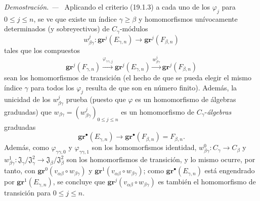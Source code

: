 \documentclass[10pt,oneside]{book}
\newenvironment{proof}{%
  \par\medskip\noindent\textit{Demostración. ---\ }}{\par}
\begin{document}
\begin{proof}
Aplicando el criterio (19.1.3) a cada uno de los $\varphi_j$ para $0\leq j\leq n$,
se ve que existe un índice $\gamma\geq\beta$ y homomorfismos
unívocamente determinados (y sobreyectivos) de $C_\gamma$-módulos
\[
  w_{\beta\gamma}^j:\mathbf{gr}^j(E_{\gamma,n})\longrightarrow
  \mathbf{gr}^j(F_{\beta,n})
\]
tales que los compuestos
\[
  \mathbf{gr}^j(F_{\gamma,n})
  \xrightarrow{\varphi_{\gamma\gamma,j}}\mathbf{gr}^j(E_{\gamma,n})
  \xrightarrow{w_{\beta\gamma}^j}\mathbf{gr}^j(F_{\beta,n})
\]
sean los homomorfismos de transición (el hecho de que se pueda elegir el mismo
índice $\gamma$ para todos los $\varphi_j$ resulta de que son en número
finito). Además, la unicidad de los $w_{\beta\gamma}^j$ prueba (puesto que $\varphi$ es
un homomorfismo de álgebras graduadas) que
$w_{\beta\gamma}=(w_{\beta\gamma}^j)_{0\leq j\leq n}$ es un homomorfismo de
$C_\gamma$-\emph{álgebras} graduadas
\[
  \mathbf{gr}^\bullet(E_{\gamma,n})\longrightarrow
  \mathbf{gr}^\bullet(F_{\beta,n})=F_{\beta,n}.
\]
Además, como $\varphi_{\gamma\gamma,0}$ y $\varphi_{\gamma\gamma,1}$ son
los homomorfismos identidad,
$w_{\beta\gamma}^0:C_\gamma\to C_\beta$ y
$w_{\beta\gamma}^1:\mathfrak J_\gamma/\mathfrak J_\gamma^2
\to\mathfrak J_\beta/\mathfrak J_\beta^2$ son los homomorfismos de
transición, y lo mismo ocurre, por tanto, con
$\mathbf{gr}^0(v_{\alpha\beta}\circ w_{\beta\gamma})$ y
$\mathbf{gr}^1(v_{\alpha\beta}\circ w_{\beta\gamma})$; como
$\mathbf{gr}^\bullet(E_{\gamma,n})$ está engendrado por $\mathbf{gr}^1(E_{\gamma,n})$, se concluye que
$\mathbf{gr}^j(v_{\alpha\beta}\circ w_{\beta\gamma})$ es también el homomorfismo de
transición para $0\leq j\leq n$.


\end{proof}
\end{document}
